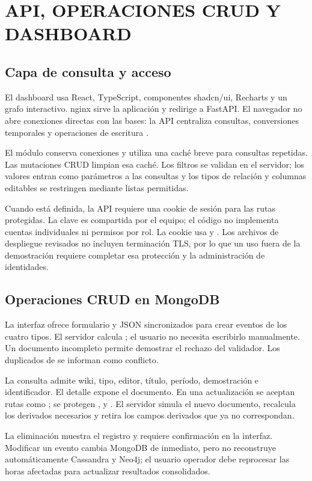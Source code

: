 \chapter{API, OPERACIONES CRUD Y DASHBOARD}
\label{cap:aplicacion}
\section{Capa de consulta y acceso}
El dashboard usa React, TypeScript, componentes shadcn/ui, Recharts y un grafo interactivo. nginx sirve la aplicación y redirige  a FastAPI. El navegador no abre conexiones directas con las bases: la API centraliza consultas, conversiones temporales y operaciones de escritura \cite{repo}.

El módulo  conserva conexiones y utiliza una caché breve para consultas repetidas. Las mutaciones CRUD limpian esa caché. Los filtros se validan en el servidor; los valores entran como parámetros a las consultas y los tipos de relación y columnas editables se restringen mediante listas permitidas.

Cuando  está definida, la API requiere una cookie de sesión para las rutas protegidas. La clave es compartida por el equipo; el código no implementa cuentas individuales ni permisos por rol. La cookie usa  y . Los archivos de despliegue revisados no incluyen terminación TLS, por lo que un uso fuera de la demostración requiere completar esa protección y la administración de identidades.

\section{Operaciones CRUD en MongoDB}
La interfaz ofrece formulario y JSON sincronizados para crear eventos de los cuatro tipos. El servidor calcula ; el usuario no necesita escribirlo manualmente. Un documento incompleto permite demostrar el rechazo del validador. Los duplicados de  se informan como conflicto.

La consulta admite wiki, tipo, editor, título, período, demostración e identificador. El detalle expone el documento. En una actualización se aceptan rutas como ; se protegen ,  y . El servidor simula el nuevo documento, recalcula los derivados necesarios y retira los campos derivados que ya no correspondan.

La eliminación muestra el registro y requiere confirmación en la interfaz. Modificar un evento cambia MongoDB de inmediato, pero no reconstruye automáticamente Cassandra y Neo4j; el usuario operador debe reprocesar las horas afectadas para actualizar resultados consolidados.

